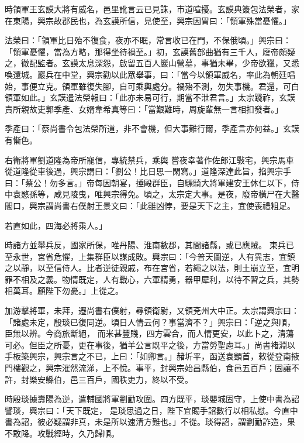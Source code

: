 \begin{pinyinscope}
 時領軍王玄謨大將有威名，邑里訛言云已見誅，市道喧擾。玄謨典簽包法榮者，家在東陽，興宗故郡民也，為玄謨所信，見使至，興宗因胃曰：「領軍殊當憂懼。」



 法榮曰：「領軍比日殆不復食，夜亦不眠，常言收已在門，不保俄頃。」興宗曰：「領軍憂懼，當為方略，那得坐待禍至。」初，玄謨舊部曲猶有三千人，廢帝頗疑之，徹配監者。玄謨太息深怨，啟留五百人巖山營墓，事猶未畢，少帝欲獵，又悉
 喚還城。巖兵在中堂，興宗勸以此眾舉事，曰：「當今以領軍威名，率此為朝廷唱始，事便立克。領軍雖復失腳，自可乘輿處分。禍殆不測，勿失事機。君還，可白領軍如此。」玄謨遣法榮報曰：「此亦未易可行，期當不泄君言。」太宗踐祚，玄謨責所親故吏郭季產、女婿韋希真等曰：「當艱難時，周旋輩無一言相扣發者。」



 季產曰：「蔡尚書令包法榮所道，非不會機，但大事難行爾，季產言亦何益。」玄謨有慚色。



 右衛將軍劉道隆為帝所寵信，專統禁兵，乘輿
 嘗夜幸著作佐郎江斅宅，興宗馬車從道隆從車後過，興宗謂曰：「劉公！比日思一閑寫。」道隆深達此旨，掐興宗手曰：「蔡公！勿多言。」帝每因朝宴，捶毆群臣，自驃騎大將軍建安王休仁以下，侍中袁愍孫等，咸見陵曳，唯興宗得免。頃之，太宗定大事。是夜，廢帝橫尸在大醫閣口，興宗謂尚書右僕射王景文曰：「此雖凶悖，要是天下之主，宜使喪禮粗足。



 若直如此，四海必將乘人。」



 時諸方並舉兵反，國家所保，唯丹陽、淮南數郡，其間諸縣，或已應賊。
 東兵已至永世，宮省危懼，上集群臣以謀成敗。興宗曰：「今普天圖逆，人有異志，宜鎮之以靜，以至信侍人。比者逆徒親戚，布在宮省，若繩之以法，則土崩立至，宜明罪不相及之義。物情既定，人有戰心，六軍精勇，器甲犀利，以待不習之兵，其勢相萬耳。願陛下勿憂。」上從之。



 加游擊將軍，未拜，遷尚書右僕射，尋領衛尉，又領兗州大中正。太宗謂興宗曰：「諸處未定，殷琰已復同逆。頃日人情云何？事當濟不？」興宗曰：「逆之與順，臣無以辨。今商旅斷絕，
 而米甚豐賤，四方雲合，而人情更安，以此卜之，清蕩可必。但臣之所憂，更在事後，猶羊公言既平之後，方當勞聖慮耳。」尚書褚淵以手板築興宗，興宗言之不已，上曰：「如卿言。」赭圻平，函送袁顗首，敕從登南掖門樓觀之，興宗漼然流涕，上不悅。事平，封興宗始昌縣伯，食邑五百戶；固讓不許，封樂安縣伯，邑三百戶，國秩吏力，終以不受。



 時殷琰據壽陽為逆，遣輔國將軍劉勔攻圍。四方既平，琰嬰城固守，上使中書為詔譬琰，興宗曰：「天下既定，
 是琰思過之日，陛下宜賜手詔數行以相私慰。今直中書為詔，彼必疑謂非真，未是所以速清方難也。」不從。琰得詔，謂劉勔詐造，果不敢降。攻戰經時，久乃歸順。




\end{pinyinscope}
